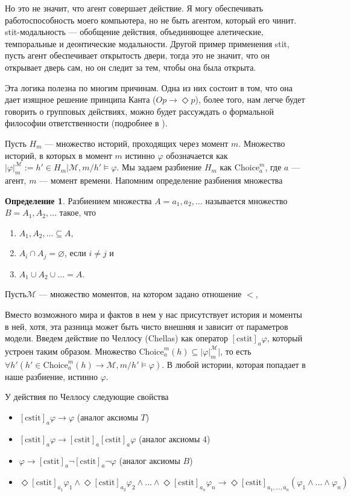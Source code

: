 \documentclass[openany]{book}
\theoremstyle{plain}
\theoremstyle{definition}
\newtheorem{defn}{Определение}[section]
\begin{document}
Но это не значит, что агент совершает действие. Я могу обеспечивать работоспособность моего компьютера, но не быть агентом, который его чинит. stit-модальность --- обобщение действия, объединяющее алетические, темпоральные и деонтические модальности. Другой пример применения stit, пусть агент обеспечивает открытость двери, тогда это не значит, что он открывает дверь сам, но он следит за тем, чтобы она была открыта.

Эта логика полезна по многим причинам. Одна из них состоит в том, что она дает изящное решение принципа Канта (\(O p \to \Diamond p\)), более того, нам легче будет говорить о групповых действиях, можно будет рассуждать о формальной философии ответственности (подробнее в \cite{Duijf}).

Пусть \(H_m\) --- множество историй, проходящих через момент \(m\). Множество историй, в которых в момент \(m\) истинно \(\varphi\) обозначается как \(|\varphi|_m^{\mathcal{M}} := {h' \in H_m | \mathcal{M}, m/h' \models \varphi}\). Мы задаем разбиение \(H_m\) как \(\mathrm{Choice}_a^m\), где \(a\) --- агент, \(m\) --- момент времени. Напомним определение разбиения множества 
\begin{defn}
    Разбиением множества \(A = {a_1, a_2, \dots}\) называется множество \(B = {A_1, A_2, \dots}\) такое, что
    \begin{enumerate}
	\item \(A_1, A_2, \dots \subseteq A\),
	\item \(A_i \cap A_j = \varnothing\), если \(i \not= j\) и
	\item \(A_1 \cup A_2 \cup \dots = A\).
    \end{enumerate}
\end{defn}

Пусть\(\mathcal{M}\) --- множество моментов, на котором задано отношение \(<\), 

Вместо возможного мира и фактов в нем у нас присутствует история и моменты в ней, хотя, эта разница может быть чисто внешняя и зависит от параметров модели. Введем действие по Челлосу (Chellas) как оператор \([\mathrm{cstit}]_a \varphi\), который устроен таким образом. Множество \(\mathrm{Choice}_a^m (h) \subseteq |\varphi|_m^{\mathcal{M}}|\), то есть \(\forall h' (h' \in \mathrm{Choice}_a^m (h) \to \mathcal{M}, m/h' \models \varphi)\). В любой истории, которая попадает в наше разбиение, истинно \(\varphi\). 

У действия по Челлосу следующие свойства
\begin{itemize}
    \item \([\mathrm{cstit}]_a \varphi \to \varphi\) (аналог аксиомы \(T\))
    \item \([\mathrm{cstit}]_a \varphi \to [\mathrm{cstit}]_a [\mathrm{cstit}]_a \varphi\) (аналог аксиомы \(4\))
    \item \(\varphi \to  [\mathrm{cstit}]_a \neg [\mathrm{cstit}]_a \neg \varphi\) (аналог аксиомы \(B\))
    \item \(\Diamond [\mathrm{cstit}]_{a_1} \varphi_1 \land \Diamond[\mathrm{cstit}]_{a_2} \varphi_2 \land \dots \land \Diamond[\mathrm{cstit}]_{a_n} \varphi_n \to \Diamond [\mathrm{cstit}]_{a_1, \ldots, a_n} (\varphi_1 \land \dots \land \varphi_n) \)
\end{itemize}
\end{document}
